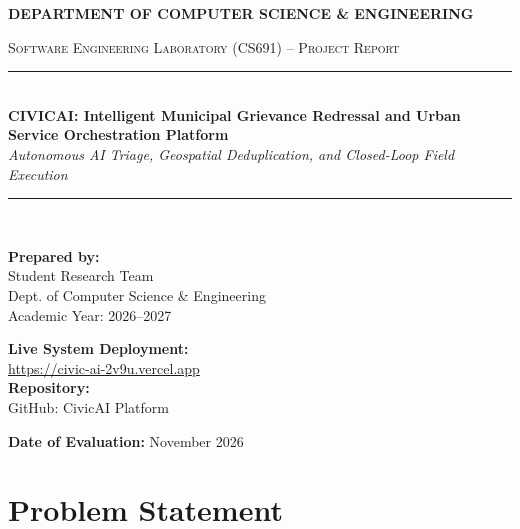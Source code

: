 \documentclass[11pt,a4paper]{article}
\begin{document}
\begin{titlepage}
    \centering
    \vspace*{1cm}
    {\Large \textbf{DEPARTMENT OF COMPUTER SCIENCE \& ENGINEERING}}\par
    \vspace{0.4cm}
    {\large \textsc{Software Engineering Laboratory (CS691) -- Project Report}}\\[1.5cm]
    
    \rule{\linewidth}{1.5pt}\\[0.4cm]
    {\huge \bfseries \color{primaryblue} CIVICAI: Intelligent Municipal Grievance Redressal and Urban Service Orchestration Platform}\\[0.2cm]
    {\large \textit{Autonomous AI Triage, Geospatial Deduplication, and Closed-Loop Field Execution}}\\[0.2cm]
    \rule{\linewidth}{1.5pt}\\[1.5cm]

    \begin{minipage}[t]{0.45\textwidth}
        \textbf{Prepared by:}\\
        Student Research Team\\
        Dept. of Computer Science \& Engineering\\
        Academic Year: 2026--2027
    \end{minipage}
    \hfill
    \begin{minipage}[t]{0.45\textwidth}
        \raggedleft
        \textbf{Live System Deployment:}\\
        \href{https://civic-ai-2v9u.vercel.app}{https://civic-ai-2v9u.vercel.app}\\[0.2cm]
        \textbf{Repository:}\\
        GitHub: CivicAI Platform
    \end{minipage}

    \vfill
    {\large \textbf{Date of Evaluation:}} November 2026\\
    \vspace{0.5cm}
\end{titlepage}

\newpage
\tableofcontents
\newpage

\section{Problem Statement}
\end{document}
